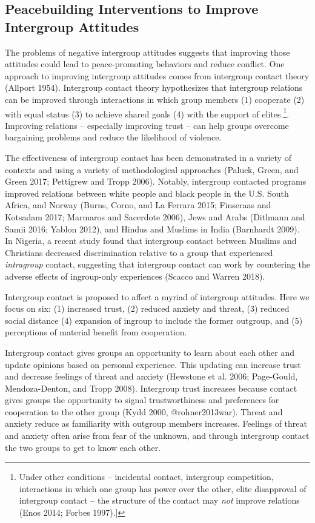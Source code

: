 \documentclass[11pt]{article}
\begin{document}
\hypertarget{peacebuilding-interventions-to-improve-intergroup-attitudes}{%
\subsection{Peacebuilding Interventions to Improve Intergroup
Attitudes}\label{peacebuilding-interventions-to-improve-intergroup-attitudes}}

The problems of negative intergroup attitudes suggests that improving
those attitudes could lead to peace-promoting behaviors and reduce
conflict. One approach to improving intergroup attitudes comes from
intergroup contact theory (Allport 1954). Intergroup contact theory
hypothesizes that intergroup relations can be improved through
interactions in which group members (1) cooperate (2) with equal status
(3) to achieve shared goals (4) with the support of elites.\footnote{Under
  other conditions -- incidental contact, intergroup competition,
  interactions in which one group has power over the other, elite
  disapproval of intergroup contact -- the structure of the contact may
  \emph{not} improve relations (Enos 2014; Forbes 1997).{]}}. Improving
relations -- especially improving trust -- can help groups overcome
bargaining problems and reduce the likelihood of violence.

The effectiveness of intergroup contact has been demonstrated in a
variety of contexts and using a variety of methodological approaches
(Paluck, Green, and Green 2017; Pettigrew and Tropp 2006). Notably,
intergroup contacted programs improved relations between white people
and black people in the U.S. South Africa, and Norway (Burns, Corno, and
La Ferrara 2015; Finseraas and Kotsadam 2017; Marmaros and Sacerdote
2006), Jews and Arabs (Ditlmann and Samii 2016; Yablon 2012), and Hindus
and Muslims in India (Barnhardt 2009). In Nigeria, a recent study found
that intergroup contact between Muslims and Christians decreased
discrimination relative to a group that experienced \emph{intragroup}
contact, suggesting that intergroup contact can work by countering the
adverse effects of ingroup-only experiences (Scacco and Warren 2018).

Intergroup contact is proposed to affect a myriad of intergroup
attitudes. Here we focus on six: (1) increased trust, (2) reduced
anxiety and threat, (3) reduced social distance (4) expansion of ingroup
to include the former outgroup, and (5) perceptions of material benefit
from cooperation.

Intergroup contact gives groups an opportunity to learn about each other
and update opinions based on personal experience. This updating can
increase trust and decrease feelings of threat and anxiety (Hewstone et
al. 2006; Page-Gould, Mendoza-Denton, and Tropp 2008). Intergroup trust
increases because contact gives groups the opportunity to signal
trustworthiness and preferences for cooperation to the other group (Kydd
2000, @rohner2013war). Threat and anxiety reduce as familiarity with
outgroup members increases. Feelings of threat and anxiety often arise
from fear of the unknown, and through intergroup contact the two groups
to get to know each other.
\end{document}
